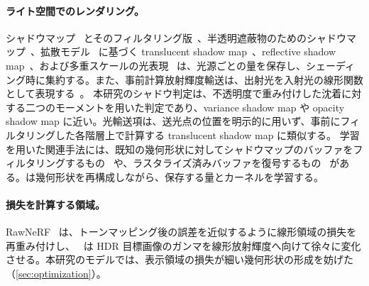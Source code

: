 \paragraph{ライト空間でのレンダリング。}
シャドウマップ~\cite{williams1978casting} とそのフィルタリング版~\cite{reeves1987rendering,fernando2005percentage,donnelly2006variance,annen2007convolution,annen2008exponential,peters2015moment}、半透明遮蔽物のためのシャドウマップ~\cite{lokovic2000deep,kim2001opacity,yuksel2008deep,jansen2010fourier,salvi2010adaptive,peters2016beyond}、拡散モデル~\cite{jensen2001practical,deon2007efficient} に基づく translucent shadow map~\cite{dachsbacher2003translucent,jimenez2010real}、reflective shadow map~\cite{dachsbacher2005reflective,dachsbacher2006splatting}、および多重スケールの光表現~\cite{kaplanyan2010cascaded,crassin2011interactive} は、光源ごとの量を保存し、シェーディング時に集約する。また、事前計算放射輝度輸送は、出射光を入射光の線形関数として表現する~\cite{sloan2002precomputed}。
本研究のシャドウ判定は、不透明度で重み付けした沈着に対する二つのモーメントを用いた判定であり、variance shadow map や opacity shadow map に近い。光輸送項は、送光点の位置を明示的に用いず、事前にフィルタリングした各階層上で計算する translucent shadow map に類似する。
学習を用いた関連手法には、既知の幾何形状に対してシャドウマップのバッファをフィルタリングするもの~\cite{datta2022neural} や、ラスタライズ済みバッファを復号するもの~\cite{nalbach2017deep,thies2019deferred,gao2020deferred,zhang2021neural,ye2024deferred} がある。\ours は幾何形状を再構成しながら、保存する量とカーネルを学習する。

\paragraph{損失を計算する領域。}
RawNeRF~\cite{mildenhall2022nerf} は、トーンマッピング後の誤差を近似するように線形領域の損失を再重み付けし、\gsthree~\cite{bi2024gs3} は HDR 目標画像のガンマを線形放射輝度へ向けて徐々に変化させる。本研究のモデルでは、表示領域の損失が細い幾何形状の形成を妨げた（\cref{sec:optimization}）。
